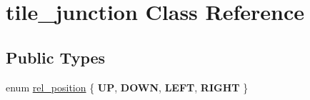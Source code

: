 \hypertarget{classtile__junction}{\section{tile\-\_\-junction Class Reference}
\label{classtile__junction}
}
\subsection*{Public Types}
\begin{DoxyCompactItemize}
\item 
enum \hyperlink{classtile__junction_a5456dfccc6f959d29361cde7104b4c25}{rel\-\_\-position} \{ {\bfseries U\-P}, 
{\bfseries D\-O\-W\-N}, 
{\bfseries L\-E\-F\-T}, 
{\bfseries R\-I\-G\-H\-T}
 \}
\end{DoxyCompactItemize}
